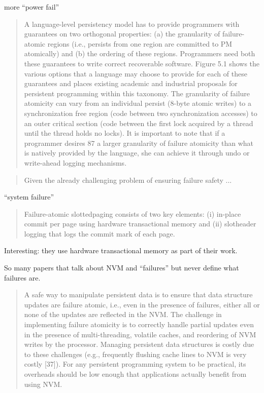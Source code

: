 more ``power fail''\cite{joshi2017atom}

\begin{quotation}
    A language-level persistency model has to provide programmers with guarantees on
two orthogonal properties: (a) the granularity of failure-atomic regions (i.e., persists from
one region are committed to PM atomically) and (b) the ordering of these regions. Programmers
need both these guarantees to write correct recoverable software. Figure 5.1
shows the various options that a language may choose to provide for each of these guarantees
and places existing academic and industrial proposals for persistent programming
within this taxonomy. The granularity of failure atomicity can vary from an individual
persist (8-byte atomic writes) to a synchronization free region (code between two synchronization
accesses) to an outer critical section (code between the first lock acquired by a
thread until the thread holds no locks). It is important to note that if a programmer desires
87
a larger granularity of failure atomicity than what is natively provided by the language, she
can achieve it through undo or write-ahead logging mechanisms.\cite{kolli2017architecting}
\end{quotation}

\begin{quotation}
    Given the already challenging problem of ensuring failure safety ...\cite{wang2017hardware}
\end{quotation}

``system failure''\cite{xia2017hikv}

\begin{quotation}
    Failure-atomic slottedpaging
consists of two key elements: (i) in-place commit
per page using hardware transactional memory and (ii) slotheader
logging that logs the commit mark of each page.
    \cite{seo2017failure}
\end{quotation}

Interesting: they use hardware transactional memory as part of their work.

So many papers that talk about NVM and ``failures'' but never define what failures are.
\cite{wu2018espresso}

\begin{quotation}
    A safe way to
manipulate persistent data is to ensure that data structure
updates are failure atomic, i.e., even in the presence of
failures, either all or none of the updates are reflected in
the NVM. The challenge in implementing failure atomicity
is to correctly handle partial updates even in the presence
of multi-threading, volatile caches, and reordering of NVM
writes by the processor. Managing persistent data structures
is costly due to these challenges (e.g., frequently flushing
cache lines to NVM is very costly [37]). For any persistent
programming system to be practical, its overheads should
be low enough that applications actually benefit from using
NVM.\cite{Hsu:2017:NPP:3064176.3064204}
\end{quotation}

